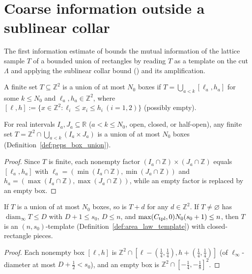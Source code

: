 \section{Coarse information outside a sublinear collar}

The first information estimate of \cite[Section~3]{OpenAI2026PolynomialPEPS}
bounds the mutual information of the lattice sample $T$ of a bounded union of
rectangles by reading $T$ as a template on the cut $\Lambda$ and applying the
sublinear collar bound (\cite[Proposition~9.6]{OpenAI2026AreaLaw}) and its
amplification.

\begin{definition}
    \label{def:peps_box_union}
    \leanok
    A finite set $T\subseteq\mathbb Z^2$ is a union of at most $N_0$ boxes if
    $T=\bigcup_{a<k}[\ell_a,h_a]$ for some $k\le N_0$ and $\ell_a,h_a\in\mathbb Z^2$,
    where $[\ell,h]:=\{x\in\mathbb Z^2:\ell_i\le x_i\le h_i\ (i=1,2)\}$ (possibly empty).
\end{definition}

\begin{lemma}
    \label{lem:peps_box_union_of_intervals}
    \leanok
    For real intervals $I_a,J_a\subseteq\mathbb R$ ($a<k\le N_0$, open, closed, or half-open), any finite set $T=\mathbb Z^2\cap\bigcup_{a<k}(I_a\times J_a)$ is a union of at most $N_0$ boxes (Definition~\ref{def:peps_box_union}).
\end{lemma}
\begin{proof}
    \leanok
    Since $T$ is finite, each nonempty factor $(I_a\cap\mathbb Z)\times(J_a\cap\mathbb Z)$ equals $[\ell_a,h_a]$ with $\ell_a=(\min(I_a\cap\mathbb Z),\min(J_a\cap\mathbb Z))$ and $h_a=(\max(I_a\cap\mathbb Z),\max(J_a\cap\mathbb Z))$, while an empty factor is replaced by an empty box.
\end{proof}

\begin{lemma}
    \label{lem:peps_box_union_template}
    \leanok
    If $T$ is a union of at most $N_0$ boxes, so is $T+d$ for any $d\in\mathbb Z^2$. If $T\ne\varnothing$ has $\operatorname{diam}_\infty T\le D$ with $D+1\le s_0$, $D\le n$, and $\max(C_{\rm tpl},0)N_0(s_0+1)\le n$, then $T$ is an $(n,s_0)$-template (Definition~\ref{def:area_law_template}) with closed-rectangle pieces.
\end{lemma}
\begin{proof}
    \leanok
    Each nonempty box $[\ell,h]$ is $\mathbb Z^2\cap[\ell-(\tfrac14,\tfrac14),h+(\tfrac14,\tfrac14)]$ (of $\ell_\infty$-diameter at most $D+\tfrac12<s_0$), and an empty box is $\mathbb Z^2\cap[-\tfrac14,-\tfrac18]^2$.
\end{proof}

